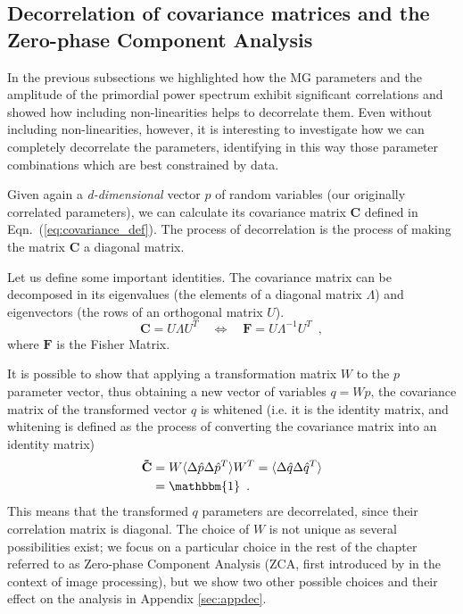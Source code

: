 \subsection{\label{sub:Decorrelation-of-covariance}Decorrelation of covariance
matrices and the Zero-phase Component Analysis}

In the previous subsections we highlighted how the MG parameters and the 
amplitude of the primordial power spectrum exhibit significant correlations and showed how including non-linearities helps to decorrelate them. Even without including non-linearities, however, it is interesting to investigate how we can completely decorrelate the parameters, identifying in this way those parameter combinations which are best constrained by data.

Given again a \emph{d-dimensional} vector
$p$ of random variables (our originally correlated parameters), we can calculate its covariance matrix $\mathbf C$ defined in Eqn.\ (\ref{eq:covariance_def}). The process of decorrelation is the process of making the matrix $\mathbf C$ 
a diagonal matrix.

Let us define some important identities. The covariance
matrix can be decomposed in its eigenvalues (the elements of a diagonal matrix $\Lambda$) and eigenvectors
(the rows of an orthogonal matrix $U$).
\begin{equation}
\mathbf C=U\Lambda U^{T} \quad \Leftrightarrow \quad 
\mathbf F=U\Lambda^{-1}U^{T} \,\,\, ,
\label{eq:eigensystemofC}
\end{equation}
where $\mathbf F$ is the Fisher Matrix.

It is possible to show that applying a transformation matrix $W$ to the $p$ parameter vector, thus obtaining a new vector of variables $q=Wp$, the covariance matrix of the transformed vector $q$ is whitened (i.e. it is the identity matrix, and whitening is defined as the process
of converting the covariance matrix into an identity matrix)
\begin{align}
\mathbf {\tilde{C}} & =W\langle\Delta\hat{p}\Delta\hat{p}^{T}\rangle W^{T} =\langle\Delta\hat{q}\Delta\hat{q}^{T}\rangle \label{eq:Cwhitened}\\
 & = \mathbbm{1} \,\,\, . \nonumber
\end{align} 
This means that the transformed $q$ parameters are decorrelated, since their correlation matrix is diagonal. The choice of $W$ 
is not unique as several  possibilities
exist; we focus on a particular choice in the rest of the chapter referred to as Zero-phase Component Analysis (ZCA, first 
introduced by \cite{Bell19973327} in the context of image processing), but we show
two other possible choices and their effect on the analysis in Appendix
\ref{sec:appdec}.

